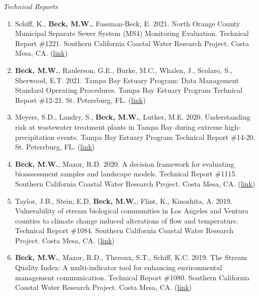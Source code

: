 \documentclass[letterpaper,12pt]{article}
\begin{document}
\vspace{\baselineskip} 
\centerline{\large{\textit{Technical Reports}}}

\begin{enumerate}

\item Schiff, K., \textbf{Beck, M.W.}, Fassman-Beck, E. 2021. North Orange County Municipal Separate Sewer System (MS4) Monitoring Evaluation. Technical Report \#1221. Southern California Coastal Water Research Project. Costa Mesa, CA. ({\footnotesize\href{https://ftp.sccwrp.org/pub/download/DOCUMENTS/TechnicalReports/1221_OCMonitoringEvaluation.pdf}{link}})

\item \textbf{Beck, M.W.}, Raulerson, G.E., Burke, M.C., Whalen, J., Scolaro, S., Sherwood, E.T. 2021. Tampa Bay Estuary Program: Data Management Standard Operating Procedures. Tampa Bay Estuary Program Technical Report \#12-21. St. Petersburg, FL. ({\footnotesize\href{https://drive.google.com/file/d/1vO4B8DJATgCSV1qOxZz-kN6Uj1BrgNsg/view?usp=sharing}{link}})

\item Meyers, S.D., Landry, S., \textbf{Beck, M.W.}, Luther, M.E. 2020. Understanding risk at wastewater treatment plants in Tampa Bay during extreme high-precipitation events. Tampa Bay Estuary Program Technical Report \#14-20. St. Petersburg, FL. ({\footnotesize\href{https://drive.google.com/file/d/1JTujiT7f7WUTF5r7__QqHwfq1oGmKj-s/view}{link}})

\item \textbf{Beck, M.W.}, Mazor, R.D. 2020. A decision framework for evaluating bioassessment samples and landscape models. Technical Report \#1115. Southern California Coastal Water Research Project. Costa Mesa, CA. ({\footnotesize\href{http://ftp.sccwrp.org/pub/download/DOCUMENTS/TechnicalReports/1115_CSCIDecisionFramework.pdf}{link}})

\item Taylor, J.B., Stein, E.D, \textbf{Beck, M.W.}, Flint, K., Kinoshita, A. 2019. Vulnerability of stream biological communities in Los Angeles and Ventura counties to climate change induced alterations of flow and temperature. Technical Report \#1084. Southern California Coastal Water Research Project. Costa Mesa, CA. ({\footnotesize\href{http://ftp.sccwrp.org/pub/download/DOCUMENTS/TechnicalReports/1084_ClimateChangeVulnerability.pdf}{link}})

\item \textbf{Beck, M.W.}, Mazor, R.D., Theroux, S.T., Schiff, K.C. 2019. The Stream Quality Index: A multi-indicator tool for enhancing environmental management communication. Technical Report \#1080. Southern California Coastal Water Research Project. Costa Mesa, CA. ({\footnotesize\href{http://ftp.sccwrp.org/pub/download/DOCUMENTS/TechnicalReports/1080_StreamQualityIndex.pdf}{link}})


\end{enumerate}
\end{document}
